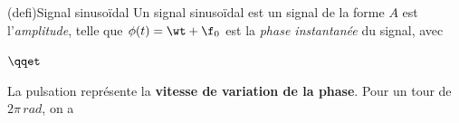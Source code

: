 \documentclass[../../main/main.tex]{subfiles}
\begin{document}
\begin{tcb}[label=def:signsu, sidebyside, righthand ratio=.4]
	(defi){Signal sinusoïdal}
	Un signal sinusoïdal est un signal de la forme
	\psw{%
		\[
			\boxed{s(t) = A\cos(\wt + \f_0)}
		\]
	}%
	$A$ est l'\textit{amplitude}, telle que
	\psw{%
		\[
			A = \frac{s_{\max} - s_{\min}}{2}
		\]
	}%
	$\phi(t) = \wt +\f_0$ est la \textit{phase instantanée} du signal, avec
	\begin{center}
		$\qqet$
	\end{center}
	La pulsation représente la \textbf{vitesse de variation de la phase}.
	Pour un tour de $2\pi\,\si{rad}$, on a
	\psw{%
		\[
			\boxed{\w = \frac{2 \pi}{T} = 2\pi f}
			\Lra
			\boxed{T = \frac{2\pi}{\w}}
		\]
	}%
	\vspace{-15pt}
	\tcblower
	\begin{center}
\end{center}
\end{tcb}
\end{document}
